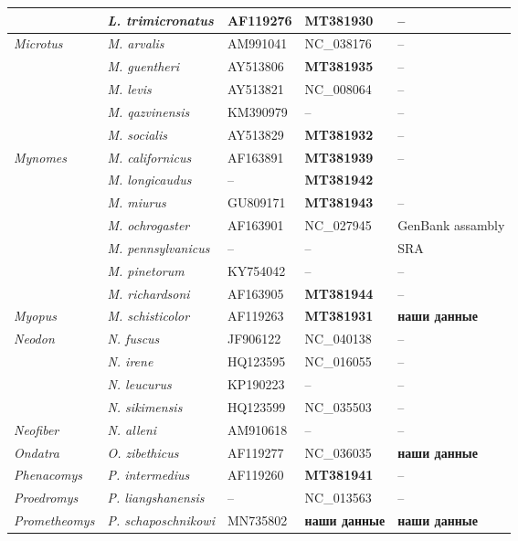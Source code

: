 \begin{landscape}
\begin{center}
\begin{longtable}{|p{3.5cm}|p{4.5cm}|p{4.0cm}|p{6.5cm}|p{4.5cm}|}
& \textit{L. trimicronatus} & AF119276 & \textbf{MT381930} & --\\ \hline
\multirow{5}{*}{\textit{Microtus}} & \textit{M. arvalis} & AM991041 & NC\_038176 & --\\ \cline{2-5}
& \textit{M. guentheri} & AY513806 & \textbf{MT381935} & --\\ \cline{2-5}
& \textit{M. levis} & AY513821 & NC\_008064 & --\\ \cline{2-5}
& \textit{M. qazvinensis} & KM390979 & -- & --\\ \cline{2-5}
& \textit{M. socialis} & AY513829 & \textbf{MT381932} & --\\ \hline
\multirow{7}{*}{\textit{Mynomes}} & \textit{M. californicus} & AF163891 & \textbf{MT381939} & --\\ \cline{2-5}
& \textit{M. longicaudus} & -- & \textbf{MT381942} & \\ \cline{2-5}
& \textit{M. miurus} & GU809171 & \textbf{MT381943} & --\\ \cline{2-5}
& \textit{M. ochrogaster} & AF163901 & NC\_027945 & GenBank assambly\\ \cline{2-5}
& \textit{M. pennsylvanicus} & -- & -- & SRA\\ \cline{2-5}
& \textit{M. pinetorum} & KY754042 & -- & --\\ \cline{2-5}
& \textit{M. richardsoni} & AF163905 & \textbf{MT381944} & --\\ \hline
\textit{Myopus} & \textit{M. schisticolor} & AF119263 & \textbf{MT381931} & \textbf{наши данные}\\ \hline
\multirow{4}{*}{\textit{Neodon}} & \textit{N. fuscus} & JF906122 & NC\_040138 & --\\ \cline{2-5}
& \textit{N. irene} & HQ123595 & NC\_016055 & --\\ \cline{2-5}
& \textit{N. leucurus} & KP190223 & -- & --\\ \cline{2-5}
& \textit{N. sikimensis} & HQ123599 & NC\_035503 & --\\ \hline
\textit{Neofiber} & \textit{N. alleni} & AM910618 & -- & --\\ \hline
\textit{Ondatra} & \textit{O. zibethicus} & AF119277 & NC\_036035 & \textbf{наши данные}\\ \hline
\textit{Phenacomys} & \textit{P. intermedius} & AF119260 & \textbf{MT381941} & --\\ \hline
\textit{Proedromys} & \textit{P. liangshanensis} & -- & NC\_013563 & --\\ \hline
\textit{Prometheomys} & \textit{P. schaposchnikowi} & MN735802 & \textbf{наши данные} & \textbf{наши данные}\\ \hline

\end{longtable}
\end{center}
\end{landscape}
